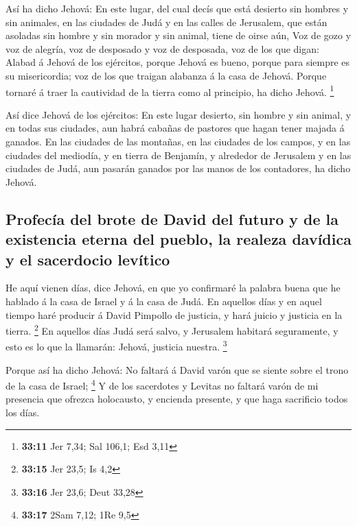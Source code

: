  Así ha dicho Jehová: En este lugar, del cual decís que
está desierto sin hombres y sin animales, en las ciudades de Judá y en
las calles de Jerusalem, que están asoladas sin hombre y sin morador y
sin animal, tiene de oirse aún,  Voz de gozo y voz de
alegría, voz de desposado y voz de desposada, voz de los que digan:
Alabad á Jehová de los ejércitos, porque Jehová es bueno, porque para
siempre es su misericordia; voz de los que traigan alabanza á la casa de
Jehová. Porque tornaré á traer la cautividad de la tierra como al
principio, ha dicho Jehová. \footnote{\textbf{33:11} Jer 7,34; Sal
  106,1; Esd 3,11}

 Así dice Jehová de los ejércitos: En este lugar
desierto, sin hombre y sin animal, y en todas sus ciudades, aun habrá
cabañas de pastores que hagan tener majada á ganados.  En
las ciudades de las montañas, en las ciudades de los campos, y en las
ciudades del mediodía, y en tierra de Benjamín, y alrededor de Jerusalem
y en las ciudades de Judá, aun pasarán ganados por las manos de los
contadores, ha dicho Jehová.

\hypertarget{profecuxeda-del-brote-de-david-del-futuro-y-de-la-existencia-eterna-del-pueblo-la-realeza-davuxeddica-y-el-sacerdocio-levuxedtico}{%
\subsection{Profecía del brote de David del futuro y de la existencia
eterna del pueblo, la realeza davídica y el sacerdocio
levítico}\label{profecuxeda-del-brote-de-david-del-futuro-y-de-la-existencia-eterna-del-pueblo-la-realeza-davuxeddica-y-el-sacerdocio-levuxedtico}}

 He aquí vienen días, dice Jehová, en que yo confirmaré
la palabra buena que he hablado á la casa de Israel y á la casa de Judá.
 En aquellos días y en aquel tiempo haré producir á David
Pimpollo de justicia, y hará juicio y justicia en la tierra. \footnote{\textbf{33:15}
  Jer 23,5; Is 4,2}  En aquellos días Judá será salvo, y
Jerusalem habitará seguramente, y esto es lo que la llamarán: Jehová,
justicia nuestra. \footnote{\textbf{33:16} Jer 23,6; Deut 33,28}

 Porque así ha dicho Jehová: No faltará á David varón que
se siente sobre el trono de la casa de Israel; \footnote{\textbf{33:17}
  2Sam 7,12; 1Re 9,5}  Y de los sacerdotes y Levitas no
faltará varón de mi presencia que ofrezca holocausto, y encienda
presente, y que haga sacrificio todos los días.


